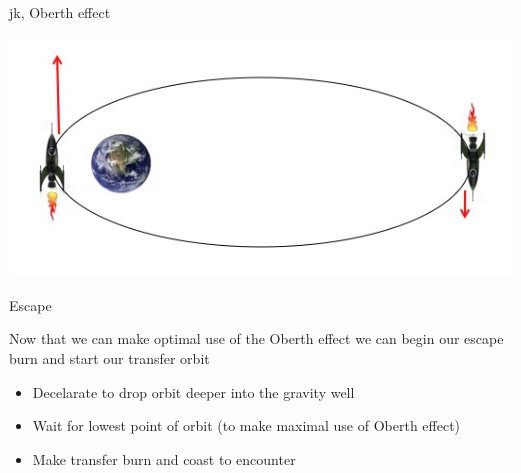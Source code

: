 \begin{frame}[t]{jk, Oberth effect}
    \begin{block}{}
        \includegraphics[width=\textwidth]{images/obert_effect}
    \end{block}
\end{frame}
\begin{frame}[t]{Escape}
    \begin{block}{}
        Now that we can make optimal use of the Oberth effect we can begin our escape burn and start our transfer orbit
    \end{block}
    \begin{block}{}
        \begin{itemize}
            \item Decelarate to drop orbit deeper into the gravity well
            \item Wait for lowest point of orbit (to make maximal use of Oberth effect)
            \item Make transfer burn and coast to encounter
        \end{itemize}
    \end{block}
\end{frame}
